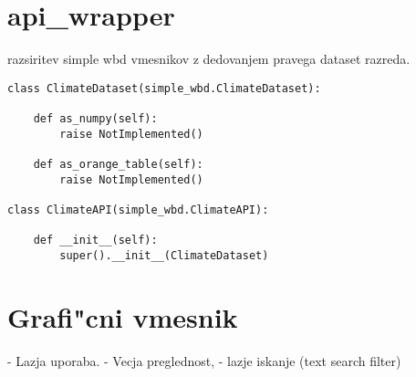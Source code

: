 \section{api\_wrapper}



razsiritev simple wbd vmesnikov z dedovanjem pravega dataset razreda.

\begin{verbatim}
class ClimateDataset(simple_wbd.ClimateDataset):
    
    def as_numpy(self):
        raise NotImplemented()
    
    def as_orange_table(self):
        raise NotImplemented()

class ClimateAPI(simple_wbd.ClimateAPI):

    def __init__(self):
        super().__init__(ClimateDataset)
\end{verbatim}





\section{Grafi"cni vmesnik}


- Lazja uporaba.
- Vecja preglednost,
- lazje iskanje (text search filter)
